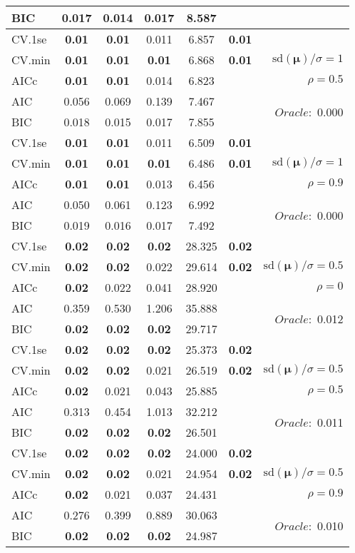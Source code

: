 \begin{table}
\begin{center}
\begin{tabular}{l*{5}{c}|r}
BIC & 0.017 & 0.014 & 0.017 & 8.587 & &  \\
 \hline 
CV.1se & {\bf 0.01} & {\bf 0.01} & 0.011 & 6.857 & {\bf 0.01} & \\
CV.min & {\bf 0.01} & {\bf 0.01} & {\bf 0.01} & 6.868 & {\bf 0.01} &  $\mathrm{sd}(\mathbf{\mu})/\sigma=1$ \\
AICc & {\bf 0.01} & {\bf 0.01} & 0.014 & 6.823 & & $\rho=0.5$ \\
AIC & 0.056 & 0.069 & 0.139 & 7.467 & &  \multirow{2}{*}{$Oracle: $ 0.000} \\
BIC & 0.018 & 0.015 & 0.017 & 7.855 & &  \\
 \hline 
CV.1se & {\bf 0.01} & {\bf 0.01} & 0.011 & 6.509 & {\bf 0.01} & \\
CV.min & {\bf 0.01} & {\bf 0.01} & {\bf 0.01} & 6.486 & {\bf 0.01} &  $\mathrm{sd}(\mathbf{\mu})/\sigma=1$ \\
AICc & {\bf 0.01} & {\bf 0.01} & 0.013 & 6.456 & & $\rho=0.9$ \\
AIC & 0.050 & 0.061 & 0.123 & 6.992 & &  \multirow{2}{*}{$Oracle: $ 0.000} \\
BIC & 0.019 & 0.016 & 0.017 & 7.492 & &  \\
 \hline 
CV.1se & {\bf 0.02} & {\bf 0.02} & {\bf 0.02} & 28.325 & {\bf 0.02} & \\
CV.min & {\bf 0.02} & {\bf 0.02} & 0.022 & 29.614 & {\bf 0.02} &  $\mathrm{sd}(\mathbf{\mu})/\sigma=0.5$ \\
AICc & {\bf 0.02} & 0.022 & 0.041 & 28.920 & & $\rho=0$ \\
AIC & 0.359 & 0.530 & 1.206 & 35.888 & &  \multirow{2}{*}{$Oracle: $ 0.012} \\
BIC & {\bf 0.02} & {\bf 0.02} & {\bf 0.02} & 29.717 & &  \\
 \hline 
CV.1se & {\bf 0.02} & {\bf 0.02} & {\bf 0.02} & 25.373 & {\bf 0.02} & \\
CV.min & {\bf 0.02} & {\bf 0.02} & 0.021 & 26.519 & {\bf 0.02} &  $\mathrm{sd}(\mathbf{\mu})/\sigma=0.5$ \\
AICc & {\bf 0.02} & 0.021 & 0.043 & 25.885 & & $\rho=0.5$ \\
AIC & 0.313 & 0.454 & 1.013 & 32.212 & &  \multirow{2}{*}{$Oracle: $ 0.011} \\
BIC & {\bf 0.02} & {\bf 0.02} & {\bf 0.02} & 26.501 & &  \\
 \hline 
CV.1se & {\bf 0.02} & {\bf 0.02} & {\bf 0.02} & 24.000 & {\bf 0.02} & \\
CV.min & {\bf 0.02} & {\bf 0.02} & 0.021 & 24.954 & {\bf 0.02} &  $\mathrm{sd}(\mathbf{\mu})/\sigma=0.5$ \\
AICc & {\bf 0.02} & 0.021 & 0.037 & 24.431 & & $\rho=0.9$ \\
AIC & 0.276 & 0.399 & 0.889 & 30.063 & &  \multirow{2}{*}{$Oracle: $ 0.010} \\
BIC & {\bf 0.02} & {\bf 0.02} & {\bf 0.02} & 24.987 & &  \\
 \hline 
\end{tabular}
\end{center}
\vspace{-1cm}
\end{table}





